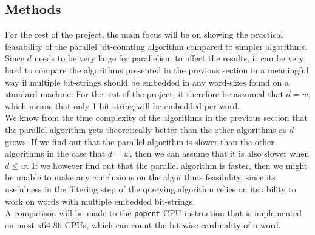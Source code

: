 
\subsection{Methods}
% 
For the rest of the project, the main focus will be on showing the practical feasability of the parallel bit-counting algorithm compared to simpler algorithms. 
Since $d$ needs to be very large for parallelism to affect the results, it can be very hard to compare the algorithms presented in the previous section in a meaningful way if multiple bit-strings should be embedded in any word-sizes found on a standard machine. For the rest of the project, it therefore be assumed that $d=w$, which means that only 1 bit-string will be embedded per word.\\
We know from the time complexity of the algorithms in the previous section that the parallel algorithm gets theoretically better than the other algorithms as $d$ grows. If we find out that the parallel algorithm is slower than the other algorithms in the case that $d=w$, then we can assume that it is also slower when $d \leq w$. If we however find out that the parallel algorithm is faster, then we might be unable to make any conclusions on the algorithms feasibility, since its usefulness in the filtering step of the querying algorithm relies on its ability to work on words with multiple embedded bit-strings. \\
A comparison will be made to the \texttt{popcnt} CPU instruction that is implemented on most x64-86 CPUs, which can count the bit-wise cardinality of a word\cite{popcnt}.

